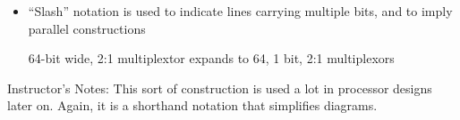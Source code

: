 \begin{frame}[fragile]
\begin{itemize}
	\item ``Slash'' notation is used to indicate lines carrying
	multiple bits, and to imply parallel constructions


64-bit wide, 2:1 multiplextor expands to 64, 1 bit, 2:1 multiplexors
\end{itemize}
\end{frame}
\BNotes\ifnum{}
\begin{frame}[fragile]
Instructor's Notes:
This sort of construction is used a lot in processor designs later
on. Again, it is a shorthand notation that simplifies diagrams.
\end{frame}
\fi\ENotes

% 
	

%     

